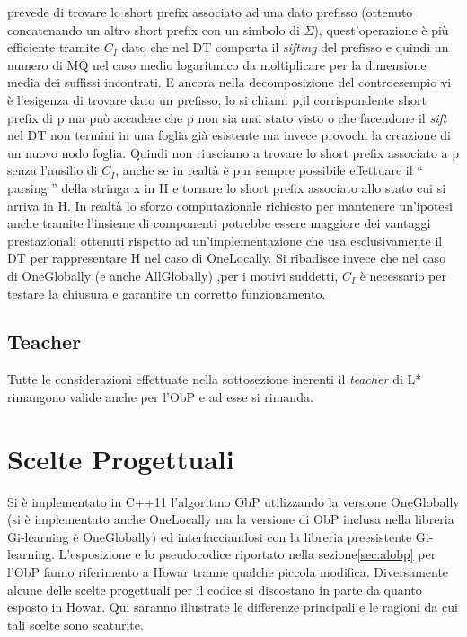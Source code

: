 prevede di trovare lo short prefix associato ad una dato prefisso (ottenuto concatenando un altro short prefix con un simbolo di $\Sigma$), quest'operazione è più efficiente tramite $C_{I}$ dato che nel \ac{DT} comporta il \textit{sifting} del prefisso e quindi un numero di \ac{MQ} nel caso medio logaritmico  da moltiplicare per la dimensione media dei suffissi incontrati. E ancora nella decomposizione del controesempio vi è l'esigenza di trovare dato un prefisso, lo si chiami p,il corrispondente short prefix di p ma può accadere che p non sia mai stato visto o che facendone il \textit{sift} nel \ac{DT} non termini in una foglia già esistente ma invece provochi la creazione di un nuovo nodo foglia. Quindi non riusciamo a trovare lo short prefix associato a p senza l'ausilio di $C_I$, anche se in realtà è pur sempre possibile effettuare il  `` parsing  '' della stringa x in \ac{H} e tornare lo short prefix associato allo stato cui si arriva in \ac{H}. In realtà lo sforzo computazionale richiesto per mantenere un'ipotesi anche tramite l'insieme di componenti potrebbe essere maggiore dei vantaggi prestazionali ottenuti rispetto ad un'implementazione che usa esclusivamente il \ac{DT} per rappresentare \ac{H} nel caso di OneLocally. Si ribadisce invece che nel caso di OneGlobally  (e anche AllGlobally) ,per i motivi suddetti, $C_I$ è necessario per testare la chiusura e garantire un corretto funzionamento.
\subsection{Teacher} Tutte le considerazioni effettuate nella sottosezione \label{sub:tea} inerenti il \textit{teacher} di L* rimangono valide anche per l'\ac{ObP} e ad esse si rimanda.  
 
\section{Scelte Progettuali} Si è implementato in C++11 l'algoritmo \ac{ObP} utilizzando la versione OneGlobally (si è implementato anche OneLocally ma la versione di \ac{ObP} inclusa nella libreria Gi-learning è OneGlobally) ed interfacciandosi con la libreria preesistente Gi-learning. L'esposizione e lo pseudocodice riportato nella sezione\ref{sec:alobp} per l'\ac{ObP} fanno riferimento a Howar \cite{Howar12} tranne qualche piccola modifica. Diversamente alcune delle scelte   progettuali per il codice  si discostano in parte da quanto esposto in Howar. Qui saranno illustrate le differenze principali e le ragioni da cui tali scelte sono scaturite.

